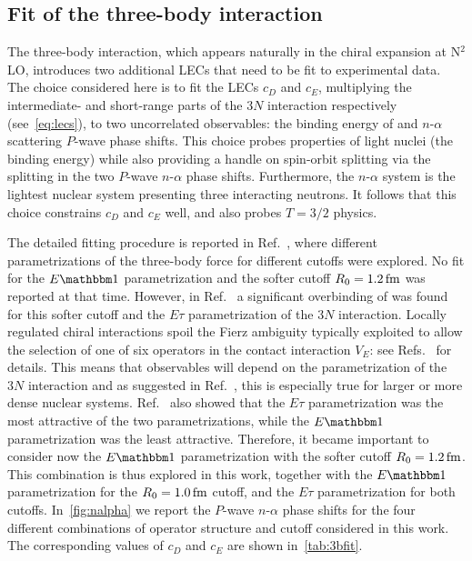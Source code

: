 \documentclass[aps,prc,twocolumn,superscriptaddress,floatfix]{revtex4-1}
\begin{document}
\subsection{Fit of the three-body interaction}
The three-body interaction, which appears naturally in the chiral
expansion at N$^2$LO, introduces two additional LECs that need to be fit
to experimental data.
The choice considered here is to fit the LECs $c_D$ and $c_E$,
multiplying the intermediate- and short-range parts of the $3N$
interaction respectively (see~\cref{eq:lecs}), to two uncorrelated
observables: the binding energy of  and $n$-$\alpha$
scattering $P$-wave phase shifts.
This choice probes properties of light nuclei (the 
binding energy) while also providing a handle on spin-orbit splitting via
the splitting in the two $P$-wave $n$-$\alpha$ phase shifts.
Furthermore, the $n$-$\alpha$ system is the lightest nuclear system
presenting three interacting neutrons.
It follows that this choice constrains $c_D$ and $c_E$ well,
and also probes $T=3/2$ physics.

The detailed fitting procedure is reported in Ref.~\cite{Lynn:2016},
where different parametrizations of the three-body force for different
cutoffs were explored.
No fit for the $E\mathbbm1$ parametrization and the softer cutoff
$R_0=1.2\,\rm fm$ was reported at that time.
However, in Ref.~\cite{Lonardoni:2017afdmc} a significant overbinding of
 was found for this softer cutoff and the $E\tau$
parametrization of the $3N$ interaction.
Locally regulated chiral interactions spoil the Fierz ambiguity
typically exploited to allow the selection of one of six operators in
the contact interaction $V_E$: see Refs.~\cite{Lynn:2016,Huth:2017} for
details.
This means that observables will depend on the parametrization of the
$3N$ interaction and as suggested in Ref.~\cite{Lynn:2016}, this is
especially true for larger or more dense nuclear systems.
Ref.~\cite{Lynn:2016} also showed that the $E\tau$ parametrization was
the most attractive of the two parametrizations, while the $E\mathbbm1$
parametrization was the least attractive.
Therefore, it became important to consider now the $E\mathbbm1$
parametrization with the softer cutoff $R_0=1.2\,\rm fm$.
This combination is thus explored in this work, together with the
$E\mathbbm1$ parametrization for the $R_0=1.0\,\rm fm$ cutoff, and the
$E\tau$ parametrization for both cutoffs.
In~\cref{fig:nalpha} we report the $P$-wave $n$-$\alpha$ phase shifts
for the four different combinations of operator structure and cutoff
considered in this work.
The corresponding values of $c_D$ and $c_E$ are shown
in~\cref{tab:3bfit}.
\end{document}
